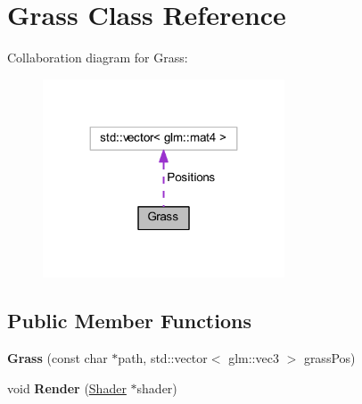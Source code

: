 \hypertarget{class_grass}{}\section{Grass Class Reference}
\label{class_grass}


Collaboration diagram for Grass\+:
\nopagebreak
\begin{figure}[H]
\begin{center}
\leavevmode
\includegraphics[width=203pt]{class_grass__coll__graph}
\end{center}
\end{figure}
\subsection*{Public Member Functions}
\begin{DoxyCompactItemize}
\item 
{\bfseries Grass} (const char $\ast$path, std\+::vector$<$ glm\+::vec3 $>$ grass\+Pos)\hypertarget{class_grass_abc975681174b5f67d3116c5bdbec65c0}{}\label{class_grass_abc975681174b5f67d3116c5bdbec65c0}

\item 
void {\bfseries Render} (\hyperlink{class_shader}{Shader} $\ast$shader)\hypertarget{class_grass_a5d3aa3ab5ad807f3cdd9b655da53f3b7}{}\label{class_grass_a5d3aa3ab5ad807f3cdd9b655da53f3b7}

\end{DoxyCompactItemize}
